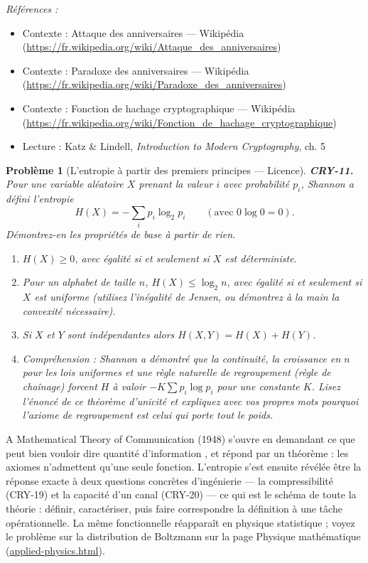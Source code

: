 \documentclass[11pt]{article}
\newtheorem{problem}{Problème}
\newenvironment{refs}{\par\small\noindent\emph{Références :}\begin{itemize}\setlength\itemsep{0pt}}{\end{itemize}\normalsize}
\begin{document}
\begin{refs}
\item Contexte : Attaque des anniversaires --- Wikipédia (\url{https://fr.wikipedia.org/wiki/Attaque_des_anniversaires})
\item Contexte : Paradoxe des anniversaires --- Wikipédia (\url{https://fr.wikipedia.org/wiki/Paradoxe_des_anniversaires})
\item Contexte : Fonction de hachage cryptographique --- Wikipédia (\url{https://fr.wikipedia.org/wiki/Fonction_de_hachage_cryptographique})
\item Lecture : Katz \& Lindell, \textit{Introduction to Modern Cryptography}, ch. 5
\end{refs}

\bigskip

\begin{problem}[{L'entropie à partir des premiers principes --- Licence}]
\textbf{CRY-11.} Pour une variable aléatoire $X$ prenant la valeur $i$
avec probabilité $p_i$, Shannon a défini l'entropie
\[ H(X) = -\sum_i p_i \log_2 p_i \qquad (\text{avec } 0\log 0 = 0). \]
Démontrez-en les propriétés de base à partir de rien.
\begin{enumerate}
\item[(a)] $H(X) \ge 0$, avec égalité si et seulement si
$X$ est déterministe.
\item[(b)] Pour un alphabet de taille $n$, $H(X) \le \log_2 n$,
avec égalité si et seulement si $X$ est uniforme (utilisez l'inégalité de Jensen, ou
démontrez à la main la convexité nécessaire).
\item[(c)] Si $X$ et $Y$ sont indépendantes alors
$H(X,Y) = H(X) + H(Y)$.
\item[(d)] Compréhension : Shannon a démontré que la continuité, la
croissance en $n$ pour les lois uniformes et une règle naturelle de regroupement (règle de
chaînage) forcent $H$ à valoir $-K\sum p_i \log p_i$ pour une constante $K$. Lisez
l'énoncé de ce théorème d'unicité et expliquez avec vos propres mots pourquoi l'axiome de
regroupement est celui qui porte tout le poids.
\end{enumerate}

\end{problem}

\noindent \og{} A Mathematical Theory of Communication \fg{} (1948) s'ouvre en demandant ce
que peut bien vouloir dire \og{} quantité d'information \fg{}, et répond par un théorème : les
axiomes n'admettent qu'une seule fonction. L'entropie s'est ensuite révélée être la réponse
exacte à deux questions concrètes d'ingénierie --- la compressibilité (CRY-19) et la capacité
d'un canal (CRY-20) --- ce qui est le schéma de toute la théorie : définir, caractériser, puis
faire correspondre la définition à une tâche opérationnelle. La même fonctionnelle
réapparaît en physique statistique ; voyez le problème sur la distribution de Boltzmann sur
la page Physique mathématique (\url{applied-physics.html}).
\end{document}
